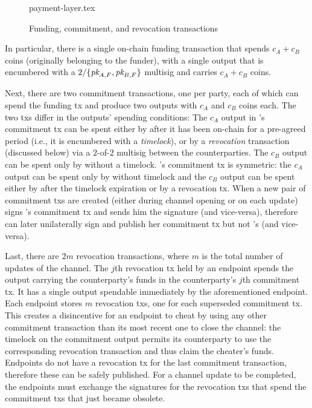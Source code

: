   \begin{figure}
    \centering
    {payment-layer.tex}
    \caption{Funding, commitment, and revocation transactions}
    \label{figure:payment-layer}
  \end{figure}

  In particular, there is a single on-chain funding transaction that spends $c_A
  + c_B$ coins (originally belonging to the funder), with a single output that is encumbered with a
  $2/\{\textit{pk}_{A, F}, \textit{pk}_{B, F}\}$ multisig and carries $c_A + c_B$ coins.

  Next, there are two commitment transactions, one per party, each of which can spend the
  funding tx and produce two outputs with $c_A$ and $c_B$ coins each. The two
  txs differ in the outputs' spending conditions: The $c_A$ output in \alice's
  commitment tx can be spent either by \alice after it has been on-chain for a
  pre-agreed period (i.e., it is encumbered with a \emph{timelock}), or by a
  \emph{revocation} transaction (discussed below) via a $2$-of-$2$ multisig between
  the counterparties. The $c_B$ output can be spent only by \bob without
  a timelock. \bob's commitment tx is symmetric: the $c_A$ output can be spent
  only by \alice without timelock and the $c_B$ output can be spent either by
  \bob after the timelock expiration or by a revocation tx. When a new pair of
  commitment txs are created (either during channel opening or on each update)
  \alice signs \bob's commitment tx and sends him the signature (and
  vice-versa), therefore \alice can later unilaterally sign and publish her commitment
  tx but not \bob's (and vice-versa).

  Last, there are $2m$ revocation transactions, where $m$ is the total number of
  updates of the channel. The $j$th revocation tx held by an endpoint spends the
  output carrying the counterparty's funds in the counterparty's $j$th
  commitment tx. It has a single output spendable immediately by the
  aforementioned endpoint. Each endpoint stores $m$ revocation txs, one for each
  superseded commitment tx. This creates a disincentive for an endpoint to cheat
  by using any other commitment transaction than its most recent one to close
  the channel: the timelock on the commitment output permits its counterparty to
  use the corresponding revocation transaction and thus claim the cheater's
  funds.  Endpoints do not have a revocation tx for the last commitment
  transaction, therefore these can be safely published. For a channel update to
  be completed, the endpoints must exchange the signatures for the revocation
  txs that spend the commitment txs that just became obsolete.

